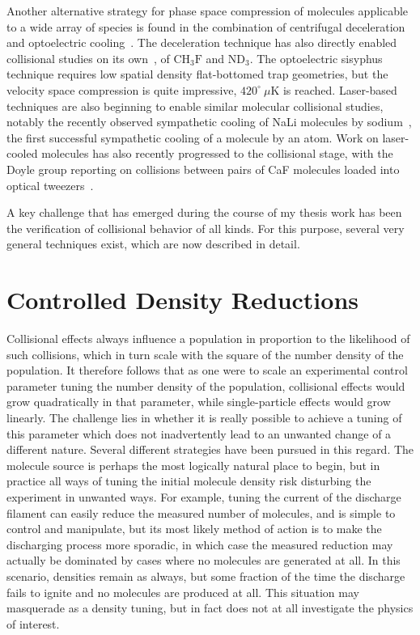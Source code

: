 Another alternative strategy for phase space compression of molecules applicable to a wide array of species is found in the combination of centrifugal deceleration and optoelectric cooling~\cite{Prehn2016}.
The deceleration technique has also directly enabled collisional studies on its own~\cite{Wu2017}, of $\text{CH}_3\text{F}$ and ND$_3$.
The optoelectric sisyphus technique requires low spatial density flat-bottomed trap geometries, but the velocity space compression is quite impressive, $420^\circ~\!\mu$K is reached.
Laser-based techniques are also beginning to enable similar molecular collisional studies, notably the recently observed sympathetic cooling of NaLi molecules by sodium~\cite{Park2019}, the first successful sympathetic cooling of a molecule by an atom.
Work on laser-cooled molecules has also recently progressed to the collisional stage, with the Doyle group reporting on collisions between pairs of CaF molecules loaded into optical tweezers~\cite{Anderegg2019}.

A key challenge that has emerged during the course of my thesis work has been the verification of collisional behavior of all kinds.
For this purpose, several very general techniques exist, which are now described in detail.

\section{Controlled Density Reductions}

Collisional effects always influence a population in proportion to the likelihood of such collisions, which in turn scale with the square of the number density of the population.
It therefore follows that as one were to scale an experimental control parameter tuning the number density of the population, collisional effects would grow quadratically in that parameter, while single-particle effects would grow linearly.
The challenge lies in whether it is really possible to achieve a tuning of this parameter which does not inadvertently lead to an unwanted change of a different nature.
Several different strategies have been pursued in this regard.
The molecule source is perhaps the most logically natural place to begin, but in practice all ways of tuning the initial molecule density risk disturbing the experiment in unwanted ways.
For example, tuning the current of the discharge filament can easily reduce the measured number of molecules, and is simple to control and manipulate, but its most likely method of action is to make the discharging process more sporadic, in which case the measured reduction may actually be dominated by cases where no molecules are generated at all.
In this scenario, densities remain as always, but some fraction of the time the discharge fails to ignite and no molecules are produced at all.
This situation may masquerade as a density tuning, but in fact does not at all investigate the physics of interest.

